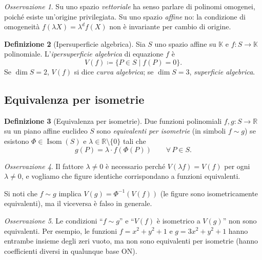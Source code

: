 \documentclass[11pt, a4paper]{book}
\theoremstyle{definition}
\newtheorem{definizione}{Definizione}[section]
\theoremstyle{plain}
\theoremstyle{remark}
\newtheorem{osservazione}[definizione]{Osservazione}
\newcommand{\R}{\mathbb{R}}
\newcommand{\K}{\mathbb{K}}
\DeclareMathOperator{\Isom}{Isom}
\begin{document}
\begin{osservazione}
Su uno spazio \emph{vettoriale} ha senso parlare di polinomi omogenei, poiché esiste un'origine privilegiata. Su uno spazio \emph{affine} no: la condizione di omogeneità $f(\lambda X) = \lambda^d f(X)$ non è invariante per cambio di origine.
\end{osservazione}

\begin{defbox}
\begin{definizione}[Ipersuperficie algebrica]
\label{def:iper-alg}
Sia $S$ uno spazio affine su $\K$ e $f \colon S \to \K$ polinomiale. L'\emph{ipersuperficie algebrica} di equazione $f$ è
\[
  V(f) \coloneqq \{ P \in S \mid f(P) = 0 \}.
\]
Se $\dim S = 2$, $V(f)$ si dice \emph{curva algebrica}; se $\dim S = 3$, \emph{superficie algebrica}.
\end{definizione}
\end{defbox}

\subsection{Equivalenza per isometrie}

\begin{defbox}
\begin{definizione}[Equivalenza per isometrie]
\label{def:equiv-iso}
Due funzioni polinomiali $f, g \colon S \to \R$ su un piano affine euclideo $S$ sono \emph{equivalenti per isometrie} (in simboli $f \sim g$) se esistono $\Phi \in \Isom(S)$ e $\lambda \in \R \setminus \{0\}$ tali che
\[
  g(P) = \lambda \cdot f(\Phi(P)) \qquad \forall\, P \in S.
\]
\end{definizione}
\end{defbox}

\begin{osservazione}
Il fattore $\lambda \neq 0$ è necessario perché $V(\lambda f) = V(f)$ per ogni $\lambda \neq 0$, e vogliamo che figure identiche corrispondano a funzioni equivalenti.

Si noti che $f \sim g$ implica $V(g) = \Phi^{-1}(V(f))$ (le figure sono isometricamente equivalenti), ma il viceversa è falso in generale.
\end{osservazione}

\begin{osservazione}
Le condizioni ``$f \sim g$'' e ``$V(f)$ è isometrico a $V(g)$'' non sono equivalenti. Per esempio, le funzioni $f = x^2+y^2+1$ e $g = 3x^2+y^2+1$ hanno entrambe insieme degli zeri vuoto, ma non sono equivalenti per isometrie (hanno coefficienti diversi in qualunque base ON).
\end{osservazione}
\end{document}
